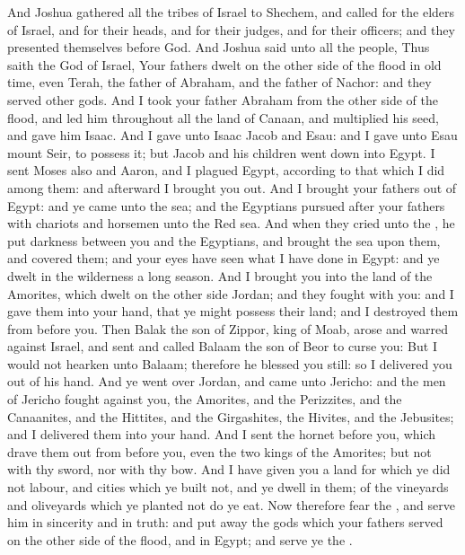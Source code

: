 \begin{biblechapter} %
 And Joshua gathered all the tribes of Israel to Shechem, and called for the elders of Israel, and for their heads, and for their judges, and for their officers; and they presented themselves before God.
\verse And Joshua said unto all the people, Thus saith the \LORD God of Israel, Your fathers dwelt on the other side of the flood in old time, even Terah, the father of Abraham, and the father of Nachor: and they served other gods.
\verse And I took your father Abraham from the other side of the flood, and led him throughout all the land of Canaan, and multiplied his seed, and gave him Isaac.
\verse And I gave unto Isaac Jacob and Esau: and I gave unto Esau mount Seir, to possess it; but Jacob and his children went down into Egypt.
\verse I sent Moses also and Aaron, and I plagued Egypt, according to that which I did among them: and afterward I brought you out.
\verse And I brought your fathers out of Egypt: and ye came unto the sea; and the Egyptians pursued after your fathers with chariots and horsemen unto the Red sea.
\verse And when they cried unto the \LORD, he put darkness between you and the Egyptians, and brought the sea upon them, and covered them; and your eyes have seen what I have done in Egypt: and ye dwelt in the wilderness a long season.
\verse And I brought you into the land of the Amorites, which dwelt on the other side Jordan; and they fought with you: and I gave them into your hand, that ye might possess their land; and I destroyed them from before you.
\verse Then Balak the son of Zippor, king of Moab, arose and warred against Israel, and sent and called Balaam the son of Beor to curse you:
\verse But I would not hearken unto Balaam; therefore he blessed you still: so I delivered you out of his hand.
\verse And ye went over Jordan, and came unto Jericho: and the men of Jericho fought against you, the Amorites, and the Perizzites, and the Canaanites, and the Hittites, and the Girgashites, the Hivites, and the Jebusites; and I delivered them into your hand.
\verse And I sent the hornet before you, which drave them out from before you, even the two kings of the Amorites; but not with thy sword, nor with thy bow.
\verse And I have given you a land for which ye did not labour, and cities which ye built not, and ye dwell in them; of the vineyards and oliveyards which ye planted not do ye eat.
\verse Now therefore fear the \LORD, and serve him in sincerity and in truth: and put away the gods which your fathers served on the other side of the flood, and in Egypt; and serve ye the \LORD.

\end{biblechapter}
